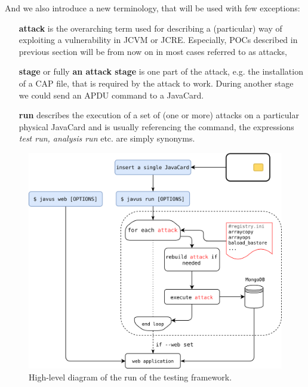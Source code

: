 \documentclass{../llncs/llncs}
\begin{document}
    And we also introduce a new terminology, that will be used with few exceptions:

                \begin{enumerate}
                    \item[\textbf{attack}] is the overarching term used for describing a (particular) way of exploiting a vulnerability in JCVM or JCRE\@. Especially, POCs described in previous section will be from now on in most cases referred to as attacks,
                    \item[\textbf{stage}] or fully \textbf{an attack stage} is one part of the attack, e.g. the installation of a CAP file, that is required by the attack to work. During another stage we could send an APDU command to a JavaCard.
                    \item[\textbf{run}] describes the execution of a set  of (one or more) attacks on a particular physical JavaCard and is usually referencing the \javusrun command, the expressions \textit{test run, analysis run} etc. are simply synonyms.
                \end{enumerate}

    \begin{figure}[htb!]
        \centering
        \includegraphics[width=.9\textwidth]{src/diagrams/full-design-new.png}
    \caption{High-level diagram of the run of the testing framework.} %
        \label{fig:full-design-diagram}
    \end{figure}
\end{document}
